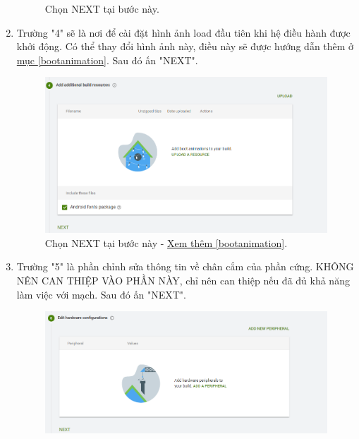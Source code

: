 \begin{enumerate}
\begin{center}
\begin{figure}[htp]
\begin{center}
\end{center}
\caption{Chọn NEXT tại bước này.}
\label{refhinh1}
\end{figure}
\end{center}
\item \label{truong4} Trường "4" sẽ là nơi để cài đặt hình ảnh load đầu tiên khi hệ điều hành được khởi động. Có thể thay đổi hình ảnh này, điều này sẽ được hướng dẫn thêm ở \hyperref[bootanimation]{mục \ref*{bootanimation}}. Sau đó ấn "NEXT".
\begin{center}
\begin{figure}[htp]
\begin{center}
\includegraphics[scale=0.45]{image3/sat11.png}
\end{center}
\caption{Chọn NEXT tại bước này -  \hyperref[bootanimation]{Xem thêm \ref*{bootanimation}}.}
\label{refhinh1}
\end{figure}
\end{center}
\item \label{truong5} Trường "5" là phần chỉnh sửa thông tin về chân cắm của phần cứng. KHÔNG NÊN CAN THIỆP VÀO PHẦN NÀY, chỉ nên can thiệp nếu đã đủ khả năng làm việc với mạch. Sau đó ấn "NEXT".
\begin{center}
\begin{figure}[htp]
\begin{center}
\includegraphics[scale=0.5]{image3/sat12.png}

\end{center}
\end{figure}
\end{center}
\end{enumerate}
